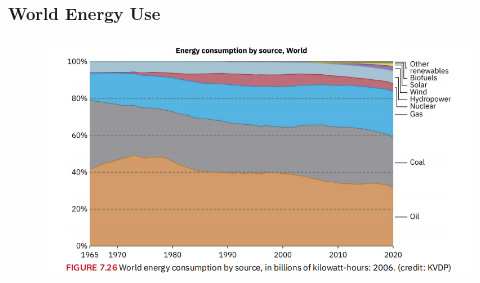\documentclass{beamer}
\begin{document}
\begin{frame}
\frametitle{World Energy Use}
\begin{figure}
    \centering
    \includegraphics[width=0.9\linewidth]{CH7/CH7.7-7.9/Screenshot 2024-11-28 120155.png}
\end{figure}
\end{frame}
\end{document}
